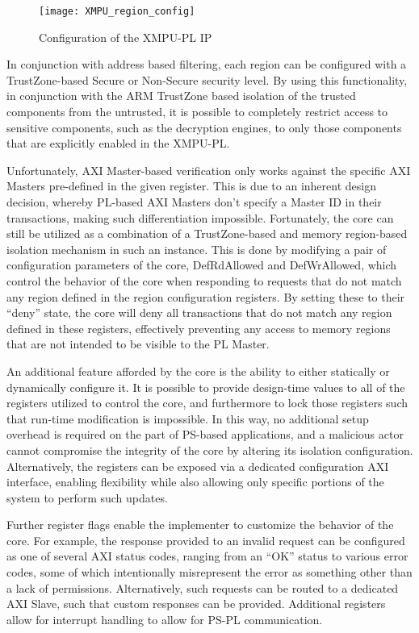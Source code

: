 \begin{figure}[h]
    \centering
    \texttt{[image: XMPU\_region\_config]}
    \caption[XMPU Region Configuration]{Configuration of the XMPU-PL IP}
    \label{fig:XMPU_region_config}
\end{figure}

In conjunction with address based filtering, each region can be configured with a TrustZone-based Secure or Non-Secure security level. By using this functionality, in conjunction with the ARM TrustZone based isolation of the trusted components from the untrusted, it is possible to completely restrict access to sensitive components, such as the decryption engines, to only those components that are explicitly enabled in the XMPU-PL.

Unfortunately, AXI Master-based verification only works against the specific AXI Masters pre-defined in the given register. This is due to an inherent design decision, whereby PL-based AXI Masters don't specify a Master ID in their transactions, making such differentiation impossible. Fortunately, the core can still be utilized as a combination of a TrustZone-based and memory region-based isolation mechanism in such an instance. This is done by modifying a pair of configuration parameters of the core, DefRdAllowed and DefWrAllowed, which control the behavior of the core when responding to requests that do not match any region defined in the region configuration registers. By setting these to their ``deny'' state, the core will deny all transactions that do not match any region defined in these registers, effectively preventing any access to memory regions that are not intended to be visible to the PL Master.

An additional feature afforded by the core is the ability to either statically or dynamically configure it. It is possible to provide design-time values to all of the registers utilized to control the core, and furthermore to lock those registers such that run-time modification is impossible. In this way, no additional setup overhead is required on the part of PS-based applications, and a malicious actor cannot compromise the integrity of the core by altering its isolation configuration. Alternatively, the registers can be exposed via a dedicated configuration AXI interface, enabling flexibility while also allowing only specific portions of the system to perform such updates.

Further register flags enable the implementer to customize the behavior of the core. For example, the response provided to an invalid request can be configured as one of several AXI status codes, ranging from an ``OK'' status to various error codes, some of which intentionally misrepresent the error as something other than a lack of permissions. Alternatively, such requests can be routed to a dedicated AXI Slave, such that custom responses can be provided. Additional registers allow for interrupt handling to allow for PS-PL communication.


